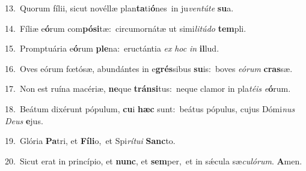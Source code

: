 {\numbfont\textcolor{\numbcolor}{13.}}~Quorum fílii, sicut novéllæ plan\-\textbf{ta}\-ti\-\textbf{ó}\-nes~\star in ju\-\textit{ven}\-\textit{tú}\textit{te} \textbf{su}\-a.\par
{\numbfont\textcolor{\numbcolor}{14.}}~Fíliæ e\-\textbf{ó}\-rum com\-\textbf{pó}\-\textbf{si}tæ:~\star circumornátæ ut simi\-\textit{li}\-\textit{tú}\textit{do} \textbf{tem}\-pli.\par
{\numbfont\textcolor{\numbcolor}{15.}}~Promptuária e\-\textbf{ó}\-rum \textbf{ple}\-na:~\star eructántia \textit{ex} \textit{hoc} \textit{in} \textbf{il}\-lud.\par
{\numbfont\textcolor{\numbcolor}{16.}}~Oves eórum fœtósæ, abundántes in e\-\textbf{grés}\-sibus \textbf{su}\-is:~\star boves \textit{e}\-\textit{ó}\textit{rum} \textbf{cras}\-sæ.\par
{\numbfont\textcolor{\numbcolor}{17.}}~Non est ruína macériæ, \textbf{ne}\-que \textbf{tráns}\-\textbf{i}tus:~\star neque clamor in pla\-\textit{té}\-\textit{is} \textit{e}\-\textbf{ó}rum.\par
{\numbfont\textcolor{\numbcolor}{18.}}~Beátum dixérunt pópulum, \textbf{cu}\-i \textbf{hæc} sunt:~\star beátus pópulus, cujus Dómi\textit{nus} \textit{De}\-\textit{us} \textbf{e}\-jus.\par
{\numbfont\textcolor{\numbcolor}{19.}}~Glória \textbf{Pa}\-tri, et \textbf{Fí}\-\textbf{li}o,~\star et Spi\-\textit{rí}\-\textit{tu}\textit{i} \textbf{Sanc}\-to.\par
{\numbfont\textcolor{\numbcolor}{20.}}~Sicut erat in princípio, et \textbf{nunc}\-, et \textbf{sem}\-per,~\star et in sǽcula sæ\-\textit{cu}\-\textit{ló}\textit{rum}. \textbf{A}\-men.\par
